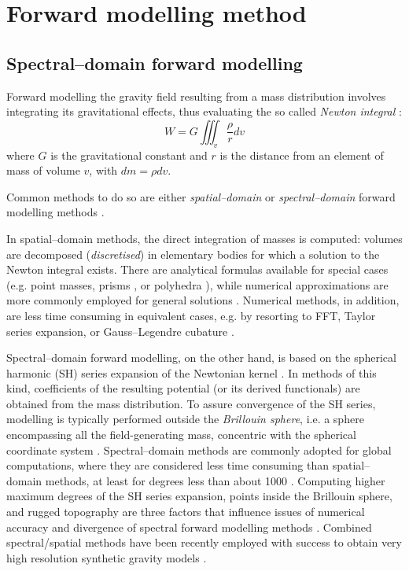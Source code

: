 \section{Forward modelling method}
\label{s:SigIs:Fwd}

\subsection{Spectral--domain forward modelling}
\label{ss:SigIs:Fwd:SHfwd}
Forward modelling the gravity field resulting from a mass distribution involves integrating its gravitational effects, thus evaluating the so called \textit{Newton integral} \parencite{HofmannWellenhof2006}:
\begin{equation}
    \label{eq:SHfwd:NewtonInt}
    W = G \iiint_v \frac{\rho}{r}dv
\end{equation}
where $G$ is the gravitational constant and $r$ is the distance from an element of mass of volume $v$, with $dm = \rho dv$.

Common methods to do so are either \textit{spatial--domain} or \textit{spectral--domain} forward modelling methods \parencite{Kuhn2005}.

In spatial--domain methods, the direct integration of masses is computed: volumes are decomposed (\textit{discretised}) in elementary bodies for which a solution to the Newton integral exists.
There are analytical formulas available for special cases (e.g. point masses, prisms \cites{Nagy2000}{Nagy2002}, or polyhedra \cites{Tsoulis2012}{Benedek2016}), while numerical approximations are more commonly employed for general solutions \parencites[e.g. spherical tesseroids][]{Heck2006}{Uieda2016}.
Numerical methods, in addition, are less time consuming in equivalent cases, e.g. by resorting to FFT, Taylor series expansion, or Gauss--Legendre cubature \parencite[see][and references therein]{Grombein2013}.
\nocite{Benedek2009} %

Spectral--domain forward modelling, on the other hand, is based on the spherical harmonic (SH) series expansion of the Newtonian kernel \parencites{Rummel1988}{Blakely1996}{Root2015}{Wieczorek2007}.
In methods of this kind, coefficients of the resulting potential (or its derived functionals) are obtained from the mass distribution.
To assure convergence of the SH series, modelling is typically performed outside the \textit{Brillouin sphere}, i.e. a sphere encompassing all the field-generating mass, concentric with the spherical coordinate system \parencite{Moritz1980}.
Spectral--domain methods are commonly adopted for global computations, where they are considered less time consuming than spatial--domain methods, at least for degrees less than about 1000 \parencite{Kuhn2005}.
Computing higher maximum degrees of the SH series expansion, points inside the Brillouin sphere, and rugged topography are three factors that influence issues of numerical accuracy and divergence of spectral forward modelling methods \parencites{Hu2015}{Hirt2017}.
Combined spectral/spatial methods have been recently employed with success to obtain very high resolution synthetic gravity models \parencite{Hirt2019}.

